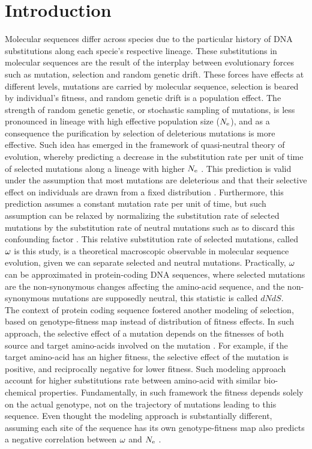 \documentclass{article}
\begin{document}
\section*{Introduction}
Molecular sequences differ across species due to the particular history of DNA substitutions along each specie's respective lineage.
These substitutions in molecular sequences are the result of the interplay between evolutionary forces such as mutation, selection and random genetic drift.
These forces have effects at different levels, mutations are carried by molecular sequence, selection is beared by individual's fitness, and random genetic drift is a population effect.
The strength of random genetic genetic, or stochastic sampling of mutations, is less pronounced in lineage with high effective population size ($N_{\mathrm{e}}$), and as a consequence the purification by selection of deleterious mutations is more effective.
Such idea has emerged in the framework of quasi-neutral theory of evolution, whereby predicting a decrease in the substitution rate per unit of time of selected mutations along a lineage with higher $N_{\mathrm{e}}$ \cite{Ohta1972, Ohta1992}.
This prediction is valid under the assumption that most mutations are deleterious and that their selective effect on individuals are drawn from a fixed distribution \cite{Welch2008}.
Furthermore, this prediction assumes a constant mutation rate per unit of time, but such assumption can be relaxed by normalizing the substitution rate of selected mutations by the substitution rate of neutral mutations such as to discard this confounding factor \cite{Ohta1972}.
This relative substitution rate of selected mutations, called $\omega$ is this study, is a theoretical macroscopic observable in molecular sequence evolution, given we can separate selected and neutral mutations.
Practically, $\omega$ can be approximated in protein-coding DNA sequences, where selected mutations are the non-synonymous changes affecting the amino-acid sequence, and the non-synonymous mutations are supposedly neutral, this statistic is called $dNdS$.\\

The context of protein coding sequence fostered another modeling of selection, based on genotype-fitness map instead of distribution of fitness effects.
In such approach, the selective effect of a mutation depends on the fitnesses of both source and target amino-acids involved on the mutation \cite{Halpern1998}.
For example, if the target amino-acid has an higher fitness, the selective effect of the mutation is positive, and reciprocally negative for lower fitness.
Such modeling approach account for higher substitutions rate between amino-acid with similar bio-chemical properties.
Fundamentally, in such framework the fitness depends solely on the actual genotype, not on the trajectory of mutations leading to this sequence.
Even thought the modeling approach is substantially different, assuming each site of the sequence has its own genotype-fitness map also predicts a negative correlation between $\omega$ and $N_{\mathrm{e}}$ \cite{Spielman2015a, DosReis2015}.\\
\end{document}
